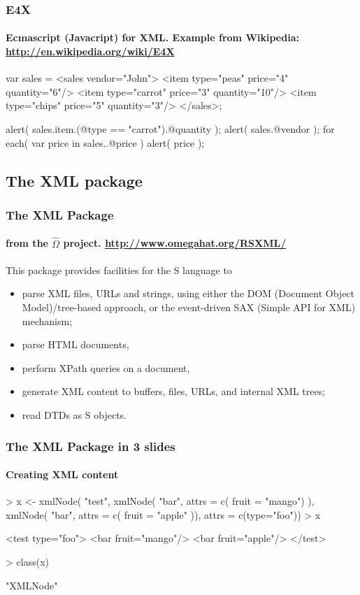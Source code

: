 \documentclass[smaller]{beamer}
\begin{document}
\begin{frame}[fragile]
\frametitle{E4X}
\framesubtitle{Ecmascript (Javacript) for XML. Example from Wikipedia: \url{http://en.wikipedia.org/wiki/E4X} }

\begin{semiverbatim}
 var sales = <sales vendor="John">
    <item type="peas" price="4" quantity="6"/>
    <item type="carrot" price="3" quantity="10"/>
    <item type="chips" price="5" quantity="3"/>
  </sales>;
 
alert( sales.item.(@type == "carrot").@quantity );
alert( sales.@vendor );
for each( var price in sales..@price ) {
  alert( price );
}
\end{semiverbatim}
 
\end{frame}


\subsection{The XML package}           
 
\begin{frame}[fragile]
 \frametitle{The XML Package}
 \framesubtitle{from the $\hat{\Omega}$ project. \url{http://www.omegahat.org/RSXML/}}

This package provides facilities for the S language to

\begin{itemize}
    \item parse XML files, URLs and strings, using either the DOM (Document Object Model)/tree-based approach, or the event-driven SAX (Simple API for XML) mechanism;
    \item parse HTML documents,
    \item perform XPath queries on a document,
    \item generate XML content to buffers, files, URLs, and internal XML trees;
    \item read DTDs as S objects. 
\end{itemize}
\end{frame}

\begin{frame}[fragile]
 \frametitle{The XML Package in 3 slides}
 \framesubtitle{Creating XML content }

\begin{Schunk}
\begin{Sinput}
> x <- xmlNode( "test", 
     xmlNode( "bar", attrs = c( fruit = "mango") ), 
     xmlNode( "bar", attrs = c( fruit = "apple" )), 
   attrs = c(type="foo"))
> x
\end{Sinput}
\begin{Soutput}
<test type="foo">
 <bar fruit="mango"/>
 <bar fruit="apple"/>
</test>
\end{Soutput}
\begin{Sinput}
> class(x)
\end{Sinput}
\begin{Soutput}
[1] "XMLNode"
\end{Soutput}
\end{Schunk}

\end{frame}
\end{document}
